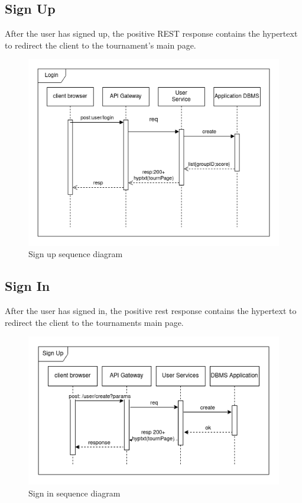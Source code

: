 \subsection{Sign Up}

After the user has signed up, the positive REST response contains the hypertext to redirect the client to the tournament's main page.

\begin{figure}[H]
    \centering
    \includegraphics[width=1\linewidth]{misc//Images//UC/UC2.png}
    \caption{Sign up sequence diagram}
    \label{fig:enter-label}
\end{figure}
\newpage
\subsection{Sign In}

After the user has signed in, the positive rest response contains the hypertext to redirect the client to the tournaments main page.

\begin{figure}[H]
    \centering
    \includegraphics[width=1\linewidth]{misc//Images//UC/UC1.png}
    \caption{Sign in sequence diagram}
    \label{fig:enter-label}
\end{figure}
\newpage
